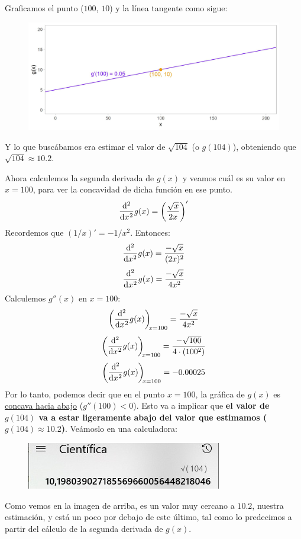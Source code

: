 \documentclass[12pt]{article}
\begin{document}
Graficamos el punto ($100$, $10$) y la línea tangente como sigue:

\begin{figure}[hbt!]
\centering
\includegraphics[scale=0.7]{img/approx_lin_sqrt.jpg}
\end{figure}

Y lo que buscábamos era estimar el valor de $\sqrt{104}$ (o $g(104)$), obteniendo que $\sqrt{104} \approx 10.2$.

Ahora calculemos la segunda derivada de $g(x)$ y veamos cuál es su valor en $x = 100$, para ver la concavidad de dicha función en ese punto.
\[\diff*[2]{g(x)}x = \left(\frac{\sqrt{x}}{2x}\right)'\]
Recordemos que $(1/x)' = -1/x^{2}$. Entonces:
\[\diff*[2]{g(x)}x = \frac{-\sqrt{x}}{(2x)^{2}}\]
\[\diff*[2]{g(x)}x = \frac{-\sqrt{x}}{4x^{2}}\]
Calculemos $g''(x)$ en $x = 100$:
\[\diff*[2]{g(x)}x[x = 100] = \frac{-\sqrt{x}}{4x^{2}}\]
\[\diff*[2]{g(x)}x[x = 100] = \frac{-\sqrt{100}}{4 \cdot (100^{2})}\]
\[\diff*[2]{g(x)}x[x = 100] = -0.00025\]
Por lo tanto, podemos decir que en el punto $x = 100$, la gráfica de $g(x)$ es \underline{concava hacia abajo} ($g''(100) < 0$). Esto va a implicar que \textbf{el valor de $g(104)$ va a estar ligeramente abajo del valor que estimamos ($g(104) \approx 10.2$)}. Veámoslo en una calculadora:

\begin{figure}[hbt!]
\centering
\includegraphics[scale=0.8]{img/approx_lin_sqrt_calc.jpg}
\end{figure}

Como vemos en la imagen de arriba, es un valor muy cercano a $10.2$, nuestra estimación, y está un poco por debajo de este último, tal como lo predecimos a partir del cálculo de la segunda derivada de $g(x)$.
\end{document}

